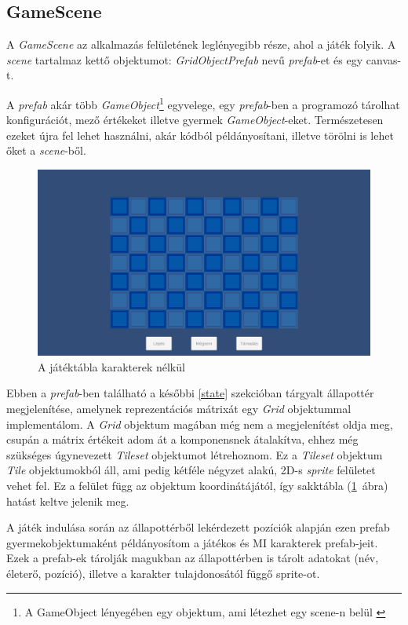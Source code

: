 \documentclass[
]{thesis-ekf}
\theoremstyle{definition}
\theoremstyle{remark}
\begin{document}
\subsection{GameScene}

A \emph{GameScene} az alkalmazás felületének leglényegibb része, ahol a játék folyik. A \emph{scene} tartalmaz kettő objektumot: \emph{GridObjectPrefab} nevű \emph{prefab}-et és egy canvas-t. 

A \emph{prefab} akár több \emph{GameObject}\footnote{A GameObject lényegében egy objektum, ami létezhet egy scene-n belül \cite{UnityDocsGameObject}} egyvelege, egy \emph{prefab}-ben a programozó tárolhat konfigurációt, mező értékeket illetve gyermek \emph{GameObject}-eket. Természetesen ezeket újra fel lehet használni, akár kódból példányosítani, illetve törölni is lehet őket a \emph{scene}-ből. \cite{UnityDocsPrefab} 

\begin{figure}[h!]
	\centering
	\includegraphics[width=13cm]{./pictures/game_grid.png}
	\caption{A játéktábla karakterek nélkül}
	\label{gamegrid}
\end{figure}

Ebben a \emph{prefab}-ben található a későbbi \ref{state} szekcióban tárgyalt állapottér megjelenítése, amelynek reprezentációs mátrixát egy \emph{Grid} objektummal implementálom. A \emph{Grid} objektum magában még nem a megjelenítést oldja meg, csupán a mátrix értékeit adom át a komponensnek átalakítva, ehhez még szükséges úgynevezett \emph{Tileset} objektumot létrehoznom. Ez a \emph{Tileset} objektum \emph{Tile} objektumokból áll, ami pedig kétféle négyzet alakú, 2D-s \emph{sprite} felületet vehet fel. Ez a felület függ az objektum koordinátájától, így sakktábla (\ref{gamegrid}~ábra) hatást keltve jelenik meg. 

A játék indulása során az állapottérből lekérdezett pozíciók alapján ezen prefab gyermekobjektumaként példányosítom a játékos és MI karakterek prefab-jeit. Ezek a prefab-ek tárolják magukban az állapottérben is tárolt adatokat (név, életerő, pozíció), illetve a karakter tulajdonosától függő sprite-ot.
\end{document}
